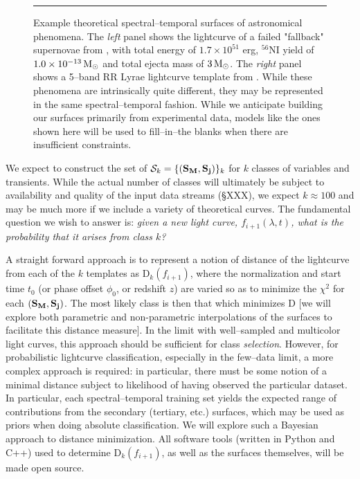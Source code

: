 \begin{figure}[t]
\centerline{ \hfil
{}} \smallskip
\caption[]{\footnotesize Example theoretical spectral--temporal surfaces of
astronomical phenomena.  The {\it left} panel shows the lightcurve of a failed
"fallback" supernovae from \cite{2009ApJ...707..193F}, with total energy of $1.7
\times 10^{51}$ erg, $^{56}$NI yield of $1.0 \times 10^{-13} {\rm\,M_\odot}$ and total
ejecta mass of $3 {\rm\,M_\odot}$.  The {\it right} panel shows a 5--band RR Lyrae
lightcurve template from \cite{2010ApJ...708..717S}.  While these phenomena are
intrinsically quite different, they may be represented in the same
spectral--temporal fashion.  While we anticipate building our surfaces primarily
from experimental data, models like the ones shown here will be used to
fill--in--the blanks when there are insufficient constraints.} \medskip \hrule
\label{fig:sts} \end{figure}


 \smallskip

We expect to construct the set of  ${\cal S}_k = \{({\bf S_M},{\bf S_j})\}_k$
for $k$ classes of variables and transients. While the actual number of classes
will ultimately be subject to availability and quality of the input data streams
(\S XXX), we expect $k \approx 100$ and may be much more if we include a variety
of theoretical curves. The fundamental question we wish to answer is: {\it given
a new light curve, $f_{i+1}(\lambda, t)$, what is the probability that it arises
from class $k$?}

A straight forward approach is to represent a notion of distance of the
lightcurve from each of the $k$ templates as {\cal D}$_k(f_{i+1})$, where the
normalization and start time $t_0$ (or phase offset $\phi_0$, or redshift $z$)
are varied so as to minimize the $\chi^2$ for each $({\bf S_M},{\bf S_j})$. The
most likely class is then that which minimizes {\cal D} [we will explore both
parametric and non-parametric interpolations of the surfaces to facilitate this
distance measure]. In the limit with well--sampled and multicolor light curves,
this approach should be sufficient for class {\it selection}. However, for
probabilistic lightcurve classification, especially in the few--data limit, a
more complex approach is required: in particular, there must be some notion of a
minimal distance subject to likelihood of having observed the particular
dataset.  In particular, each spectral--temporal training set yields the
expected range of contributions from the secondary (tertiary, etc.) surfaces,
which may be used as priors when doing absolute classification. We will explore
such a Bayesian approach to distance minimization.  All software tools (written
in Python and C++) used to determine {\cal D}$_k(f_{i+1})$, as well as the
surfaces themselves,  will be made open source.

